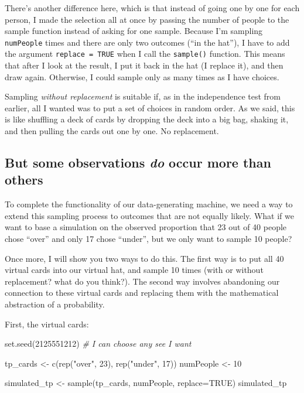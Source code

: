 \documentclass[
  openany]{book}
\newenvironment{Shaded}{\begin{snugshade}}{\end{snugshade}}
\newcommand{\AttributeTok}[1]{\textcolor[rgb]{0.77,0.63,0.00}{#1}}
\newcommand{\CommentTok}[1]{\textcolor[rgb]{0.56,0.35,0.01}{\textit{#1}}}
\newcommand{\ConstantTok}[1]{\textcolor[rgb]{0.00,0.00,0.00}{#1}}
\newcommand{\DecValTok}[1]{\textcolor[rgb]{0.00,0.00,0.81}{#1}}
\newcommand{\FunctionTok}[1]{\textcolor[rgb]{0.00,0.00,0.00}{#1}}
\newcommand{\NormalTok}[1]{#1}
\newcommand{\OtherTok}[1]{\textcolor[rgb]{0.56,0.35,0.01}{#1}}
\newcommand{\StringTok}[1]{\textcolor[rgb]{0.31,0.60,0.02}{#1}}
\begin{document}
There's another difference here, which is that instead of going one by one for each person, I made the selection all at once by passing the number of people to the sample function instead of asking for one sample. Because I'm sampling \texttt{numPeople} times and there are only two outcomes (``in the hat''), I have to add the argument \texttt{replace\ =\ TRUE} when I call the \texttt{sample()} function. This means that after I look at the result, I put it back in the hat (I replace it), and then draw again. Otherwise, I could sample only as many times as I have choices.

Sampling \emph{without replacement} is suitable if, as in the independence test from earlier, all I wanted was to put a set of choices in random order. As we said, this is like shuffling a deck of cards by dropping the deck into a big bag, shaking it, and then pulling the cards out one by one. No replacement.

\hypertarget{but-some-observations-do-occur-more-than-others}{%
\subsection*{\texorpdfstring{But some observations \emph{do} occur more than others}{But some observations do occur more than others}}\label{but-some-observations-do-occur-more-than-others}}

To complete the functionality of our data-generating machine, we need a way to extend this sampling process to outcomes that are not equally likely. What if we want to base a simulation on the observed proportion that 23 out of 40 people chose ``over'' and only 17 chose ``under'', but we only want to sample 10 people?

Once more, I will show you two ways to do this. The first way is to put all 40 virtual cards into our virtual hat, and sample 10 times (with or without replacement? what do you think?). The second way involves abandoning our connection to these virtual cards and replacing them with the mathematical abstraction of a probability.

First, the virtual cards:

\begin{Shaded}
\begin{Highlighting}[]
\FunctionTok{set.seed}\NormalTok{(}\DecValTok{2125551212}\NormalTok{) }\CommentTok{\# I can choose any see I want}

\NormalTok{tp\_cards }\OtherTok{\textless{}{-}} \FunctionTok{c}\NormalTok{(}\FunctionTok{rep}\NormalTok{(}\StringTok{"over"}\NormalTok{, }\DecValTok{23}\NormalTok{), }\FunctionTok{rep}\NormalTok{(}\StringTok{"under"}\NormalTok{, }\DecValTok{17}\NormalTok{))}
\NormalTok{numPeople }\OtherTok{\textless{}{-}} \DecValTok{10}

\NormalTok{simulated\_tp }\OtherTok{\textless{}{-}} \FunctionTok{sample}\NormalTok{(tp\_cards, numPeople, }\AttributeTok{replace=}\ConstantTok{TRUE}\NormalTok{)}
\NormalTok{simulated\_tp}
\end{Highlighting}
\end{Shaded}
\end{document}
